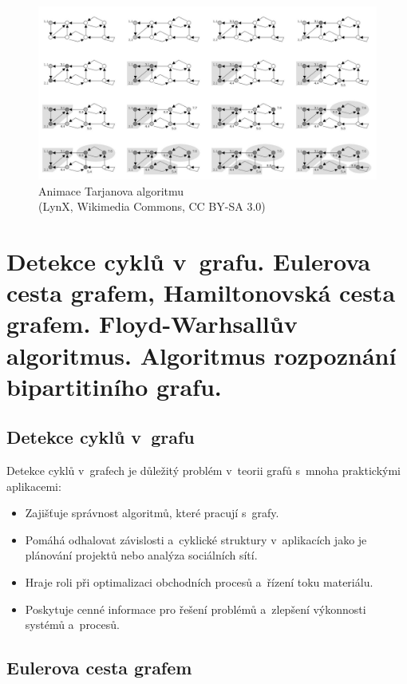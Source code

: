 \begin{figure}[ht]
    \centering
    \includegraphics[width=\textwidth]{images/3_tarjanuv-algoritmus-animace.png}

    \caption[Animace Tarjanova algoritmu]{Animace Tarjanova algoritmu\\{\small (LynX, Wikimedia Commons, CC BY-SA 3.0)}}
\end{figure}

\clearpage
\section{Detekce cyklů v~grafu. Eulerova cesta grafem, Hamiltonovská cesta grafem. Floyd-Warhsallův algoritmus. Algoritmus rozpoznání bipartitiního grafu.}

\subsection{Detekce cyklů v~grafu}

Detekce cyklů v~grafech je důležitý problém v~teorii grafů s~mnoha praktickými aplikacemi:

\begin{itemize}
    \item Zajišťuje správnost algoritmů, které pracují s~grafy.
    \item Pomáhá odhalovat závislosti a~cyklické struktury v~aplikacích jako je plánování projektů nebo analýza sociálních sítí.
    \item Hraje roli při optimalizaci obchodních procesů a~řízení toku materiálu.
    \item Poskytuje cenné informace pro řešení problémů a~zlepšení výkonnosti systémů a~procesů.
\end{itemize}

\subsection{Eulerova cesta grafem}

